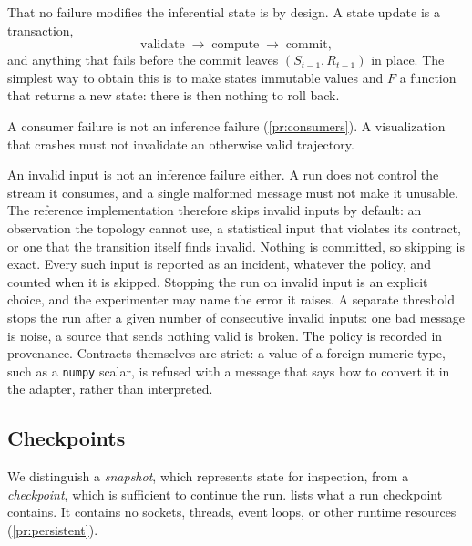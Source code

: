 \documentclass[11pt,a4paper]{article}
\theoremstyle{definition}
\theoremstyle{remark}
\newcommand{\code}[1]{\texttt{#1}}
\begin{document}
That no failure modifies the inferential state is by design. A state
update is a transaction,
\[
\text{validate}
\;\longrightarrow\;
\text{compute}
\;\longrightarrow\;
\text{commit},
\]
and anything that fails before the commit leaves $(S_{t-1},R_{t-1})$ in
place. The simplest way to obtain this is to make states immutable
values and $F$ a function that returns a new state: there is then
nothing to roll back.

A consumer failure is not an inference failure
(\cref{pr:consumers}). A visualization that crashes must not invalidate
an otherwise valid trajectory.

An invalid input is not an inference failure either. A run does not
control the stream it consumes, and a single malformed message must not
make it unusable. The reference implementation therefore skips invalid
inputs by default: an observation the topology cannot use, a statistical
input that violates its contract, or one that the transition itself
finds invalid. Nothing is committed, so skipping is exact. Every such
input is reported as an incident, whatever the policy, and counted
when it is skipped.
Stopping the run on invalid input is an explicit choice, and the
experimenter may name the error it raises. A separate threshold stops
the run after a given number of consecutive invalid inputs: one bad
message is noise, a source that sends nothing valid is broken. The policy is recorded in
provenance. Contracts themselves are strict: a value of a foreign
numeric type, such as a \code{numpy} scalar, is refused with a message
that says how to convert it in the adapter, rather than interpreted.

\subsection{Checkpoints}
\label{sec:persistence}

We distinguish a \emph{snapshot}, which represents state for inspection,
from a \emph{checkpoint}, which is sufficient to continue the run.
 lists what a run checkpoint contains. It contains
no sockets, threads, event loops, or other runtime resources
(\cref{pr:persistent}).
\end{document}
